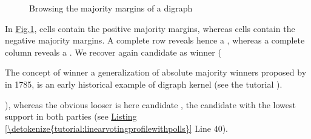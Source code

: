 \documentclass[a4paper,12pt,english]{sphinxhowto}
\let\sphinxpxdimen\pdfpxdimen\else\newdimen\sphinxpxdimen
\begin{document}
\begin{figure}[H]
\centering
\capstart

\noindent\sphinxincludegraphics[width=450\sphinxpxdimen]{{majorityMargins}.png}
\caption{Browsing the majority margins of a  digraph}\label{\detokenize{tutorial:majoritymargins}}\end{figure}

In \hyperref[\detokenize{tutorial:majoritymargins}]{Fig.\@ \ref{\detokenize{tutorial:majoritymargins}}},  cells contain the positive majority margins, whereas  cells contain the negative majority margins. A complete  row reveals hence a  , whereas a complete  column reveals a  . We recover again candidate  as  winner (%
\begin{footnote}[15]\sphinxAtStartFootnote
The concept of  winner \sphinxhyphen{}a generalization of absolute majority winners\sphinxhyphen{} proposed by  in 1785, is an early historical example of  digraph kernel (see the tutorial {\hyperref[\detokenize{tutorial:kernel-tutorial-label}]{}}).
%
\end{footnote}), whereas the obvious  looser is here candidate , the candidate with the lowest support in both parties (see \hyperref[\detokenize{tutorial:linearvotingprofilewithpolls}]{Listing \ref{\detokenize{tutorial:linearvotingprofilewithpolls}}} Line 40).
\end{document}
